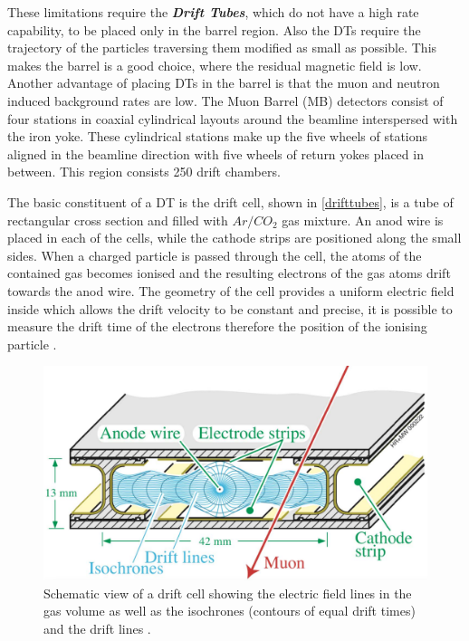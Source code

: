 These limitations require the \emph{\textbf{Drift Tubes}}, which do not have a high rate capability, to be placed only in the barrel region. Also the DTs require the trajectory of the particles traversing them modified as small as possible. This makes the barrel is a good choice, where the residual magnetic field is low. Another advantage of placing DTs in the barrel is that the muon and neutron induced background rates are low. The Muon Barrel (MB) detectors consist of four stations in coaxial cylindrical layouts around the beamline interspersed with the iron yoke. These cylindrical stations make up the five wheels of stations aligned in the beamline direction with five wheels of return yokes placed in between. This region consists 250 drift chambers.

The basic constituent of a DT is the drift cell, shown in \autoref{drifttubes}, is a tube of rectangular cross section and filled with $Ar/CO_2$ gas mixture. An anod wire is placed in each of the cells, while the cathode strips are positioned along the small sides. When a charged particle is passed through the cell, the atoms of the contained gas becomes ionised and the resulting electrons of the gas atoms drift towards the anod wire. The geometry of the cell provides a uniform electric field inside which allows the drift velocity to be constant and precise, it is possible to measure the drift time of the electrons therefore the position of the ionising particle \cite{Sirunyan_2018}.

\begin{figure}[ht]
	\centering
	\includegraphics[width=\textwidth]{MSc_Thesis/fig/drifttubes.png}
	\vspace{2mm}
	\caption[Schematic view of a drift cell showing the electric field lines in the gas volume as well as the isochrones (contours of equal drift times) and the drift lines.]{Schematic view of a drift cell showing the electric field lines in the gas volume as well as the isochrones (contours of equal drift times) and the drift lines \cite{Abbiendi:2705998}.}
	\label{drifttubes}
\end{figure}

